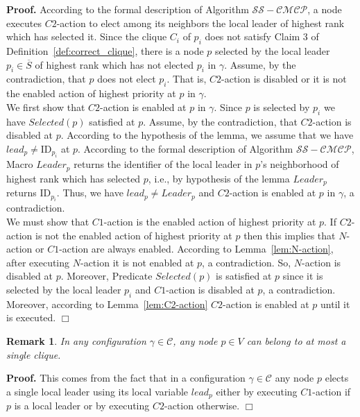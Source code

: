 \documentclass[11pt,letterpaper,onecolumn]{article}
\newenvironment{proof}{\noindent \begin{rm}{\textbf{Proof.} }}{\hspace*{\fill}$\Box$\par\end{rm} \vspace{.3cm}}
\newtheorem{rem}{Remark}
\newcommand{\id}{\mbox{ID}}
\begin{document}
\begin{proof}
According to the formal description of Algorithm $\mathcal{SS-CMCP}$, a node executes $C2$-action to elect among its neighbors the local leader of highest rank which has selected it. Since the clique $C_i$ of $p_i$ does not satisfy Claim 3 of Definition~\ref{def:correct_clique}, there is a node $p$ selected by the local leader $p_i \in \overline{S}$ of highest rank which has not elected $p_i$ in $\gamma$. Assume, by the contradiction, that $p$ does not elect $p_i$. That is, $C2$-action is disabled or it is not the enabled action of highest priority at $p$ in $\gamma$.\\
We first show that $C2$-action is enabled at $p$ in $\gamma$. Since $p$ is selected by $p_i$ we have $Selected(p)$ satisfied at $p$. Assume, by the contradiction, that $C2$-action is disabled at $p$. According to the hypothesis of the lemma, we assume that we have $lead_p \neq \id_{p_i}$ at $p$. According to the formal description of Algorithm $\mathcal{SS-CMCP}$, Macro $Leader_p$ returns the identifier of the local leader in $p$'s neighborhood of highest rank which has selected $p$, i.e., by hypothesis of the lemma $Leader_p$ returns $\id_{p_i}$. Thus, we have $lead_p \neq Leader_p$ and $C2$-action is enabled at $p$ in $\gamma$, a contradiction.\\
We must show that $C1$-action is the enabled action of highest priority at $p$. If $C2$-action is not the enabled action of highest priority at $p$ then this implies that $N$-action or $C1$-action are always enabled. According to Lemma~\ref{lem:N-action}, after executing $N$-action it is not enabled at $p$, a contradiction. So, $N$-action is disabled at $p$. Moreover, Predicate $Selected(p)$ is satisfied at $p$ since it is selected by the local leader $p_i$ and $C1$-action is disabled at $p$, a contradiction. Moreover, according to Lemma~\ref{lem:C2-action} $C2$-action is enabled at $p$ until it is executed.
\end{proof}

\begin{rem}
\label{rem:elect_clique}
In any configuration $\gamma \in \mathcal{C}$, any node $p \in V$ can belong to at most a single clique.
\end{rem}

\begin{proof}
This comes from the fact that in a configuration $\gamma \in \mathcal{C}$ any node $p$ elects a single local leader using its local variable $lead_p$ either by executing $C1$-action if $p$ is a local leader or by executing $C2$-action otherwise.
\end{proof}
\end{document}

